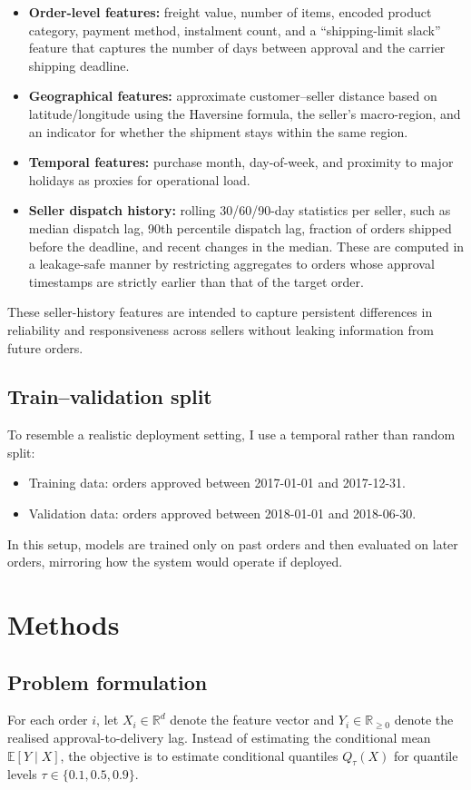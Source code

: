 \documentclass[12pt]{article}
\begin{document}
\begin{itemize}
  \item \textbf{Order-level features:} freight value, number of items, encoded product category, payment method, instalment count, and a ``shipping-limit slack'' feature that captures the number of days between approval and the carrier shipping deadline.
  \item \textbf{Geographical features:} approximate customer--seller distance based on latitude/longitude using the Haversine formula, the seller’s macro-region, and an indicator for whether the shipment stays within the same region.
  \item \textbf{Temporal features:} purchase month, day-of-week, and proximity to major holidays as proxies for operational load.
  \item \textbf{Seller dispatch history:} rolling 30/60/90-day statistics per seller, such as median dispatch lag, 90th percentile dispatch lag, fraction of orders shipped before the deadline, and recent changes in the median. These are computed in a leakage-safe manner by restricting aggregates to orders whose approval timestamps are strictly earlier than that of the target order.
\end{itemize}

These seller-history features are intended to capture persistent differences in reliability and responsiveness across sellers without leaking information from future orders.

\subsection{Train--validation split}
To resemble a realistic deployment setting, I use a temporal rather than random split:
\begin{itemize}
  \item Training data: orders approved between 2017-01-01 and 2017-12-31.
  \item Validation data: orders approved between 2018-01-01 and 2018-06-30.
\end{itemize}

In this setup, models are trained only on past orders and then evaluated on later orders, mirroring how the system would operate if deployed.

\section{Methods}

\subsection{Problem formulation}
For each order $i$, let $X_i \in \mathbb{R}^d$ denote the feature vector and $Y_i \in \mathbb{R}_{\ge 0}$ denote the realised approval-to-delivery lag. Instead of estimating the conditional mean $\mathbb{E}[Y \mid X]$, the objective is to estimate conditional quantiles $Q_\tau(X)$ for quantile levels $\tau \in \{0.1, 0.5, 0.9\}$.
\end{document}
